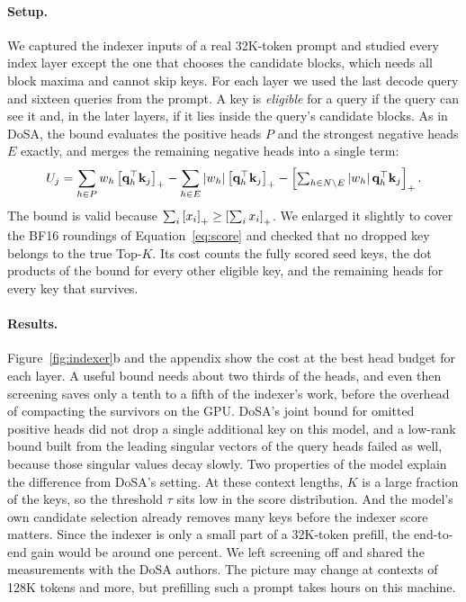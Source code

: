 \paragraph{Setup.} We captured the indexer inputs of a real 32K-token prompt and studied every index layer except the one that chooses the candidate blocks, which needs all block maxima and cannot skip keys. For each layer we used the last decode query and sixteen queries from the prompt. A key is \emph{eligible} for a query if the query can see it and, in the later layers, if it lies inside the query's candidate blocks. As in DoSA, the bound evaluates the positive heads $P$ and the strongest negative heads $E$ exactly, and merges the remaining negative heads into a single term:
\begin{equation}
U_j = \sum_{h\in P} w_h\left[\mathbf q_h^\top\mathbf k_j\right]_{+} - \sum_{h\in E} |w_h|\left[\mathbf q_h^\top\mathbf k_j\right]_{+} - \left[\textstyle\sum_{h\in N\setminus E}|w_h|\,\mathbf q_h^\top\mathbf k_j\right]_{+}.
\end{equation}
The bound is valid because $\sum_i \left[x_i\right]_{+}\ge\left[\sum_i x_i\right]_{+}$. We enlarged it slightly to cover the BF16 roundings of Equation~\eqref{eq:score} and checked that no dropped key belongs to the true Top-$K$. Its cost counts the fully scored seed keys, the dot products of the bound for every other eligible key, and the remaining heads for every key that survives.

\paragraph{Results.} Figure~\ref{fig:indexer}b and the appendix show the cost at the best head budget for each layer. A useful bound needs about two thirds of the heads, and even then screening saves only a tenth to a fifth of the indexer's work, before the overhead of compacting the survivors on the GPU. DoSA's joint bound for omitted positive heads did not drop a single additional key on this model, and a low-rank bound built from the leading singular vectors of the query heads failed as well, because those singular values decay slowly. Two properties of the model explain the difference from DoSA's setting. At these context lengths, $K$ is a large fraction of the keys, so the threshold $\tau$ sits low in the score distribution. And the model's own candidate selection already removes many keys before the indexer score matters. Since the indexer is only a small part of a 32K-token prefill, the end-to-end gain would be around one percent. We left screening off and shared the measurements with the DoSA authors. The picture may change at contexts of 128K tokens and more, but prefilling such a prompt takes hours on this machine.

